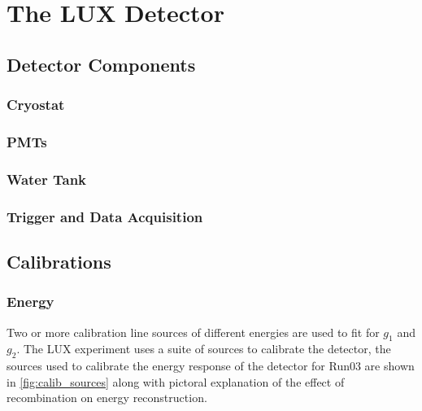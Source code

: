\chapter{The LUX Detector}

\label{ch:LUX} %

\section{Detector Components}
\subsection{Cryostat}
\subsection{PMTs}
\subsection{Water Tank}
\subsection{Trigger and Data Acquisition}

\section{Calibrations}
\subsection{Energy}
Two or more calibration line sources of different energies are used to fit for $g_{1}$ and $g_{2}$. The \ac{LUX} experiment uses a suite of sources to calibrate the detector, the sources used to calibrate the energy response of the detector for Run03 are shown in \ref{fig:calib_sources} along with pictoral explanation of the effect of recombination on energy reconstruction.


